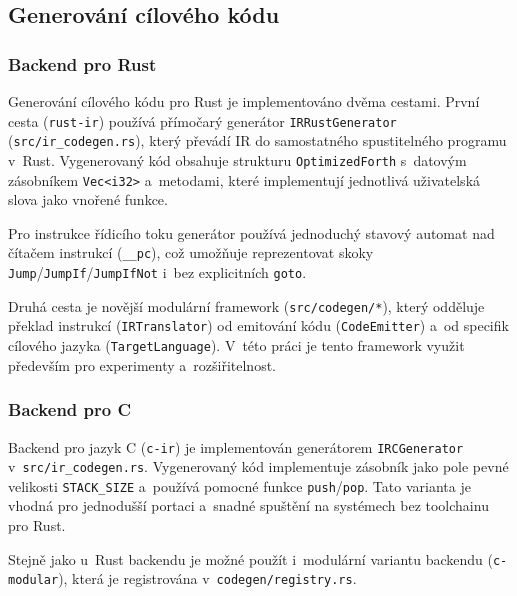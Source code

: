 \subsection{Generování cílového kódu}
\label{sec:codegen}

\subsubsection{Backend pro Rust}

Generování cílového kódu pro Rust je implementováno dvěma cestami.
První cesta (\texttt{rust-ir}) používá přímočarý generátor
\texttt{IRRustGenerator} (\texttt{src/ir\_codegen.rs}), který převádí IR do
samostatného spustitelného programu v~Rust. Vygenerovaný kód obsahuje strukturu
\texttt{OptimizedForth} s~datovým zásobníkem \texttt{Vec<i32>} a~metodami,
které implementují jednotlivá uživatelská slova jako vnořené funkce.

Pro instrukce řídicího toku generátor používá jednoduchý stavový automat
nad čítačem instrukcí (\texttt{\_\_pc}), což umožňuje reprezentovat skoky
\texttt{Jump}/\texttt{JumpIf}/\texttt{JumpIfNot} i~bez explicitních \texttt{goto}.

Druhá cesta je novější modulární framework (\texttt{src/codegen/*}), který
odděluje překlad instrukcí (\texttt{IRTranslator}) od emitování kódu
(\texttt{CodeEmitter}) a~od specifik cílového jazyka (\texttt{TargetLanguage}).
V~této práci je tento framework využit především pro experimenty a~rozšiřitelnost.

\subsubsection{Backend pro C}

Backend pro jazyk C (\texttt{c-ir}) je implementován generátorem
\texttt{IRCGenerator} v~\texttt{src/ir\_codegen.rs}. Vygenerovaný kód
implementuje zásobník jako pole pevné velikosti \texttt{STACK\_SIZE} a~používá
pomocné funkce \texttt{push}/\texttt{pop}. Tato varianta je vhodná pro jednodušší
portaci a~snadné spuštění na systémech bez toolchainu pro Rust.

Stejně jako u~Rust backendu je možné použít i~modulární variantu backendu
(\texttt{c-modular}), která je registrována v~\texttt{codegen/registry.rs}.
